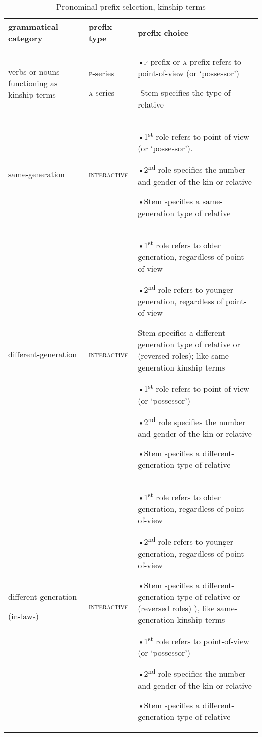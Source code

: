 \begin{table}
\caption{Pronominal prefix selection, kinship terms}
\label{tab:1:pronselkinship}
\tiny{
\begin{tabularx}{\textwidth}{XXX}

\lsptoprule
grammatical category & prefix type & prefix choice\\
\midrule
verbs or nouns functioning as kinship terms & \textsc{p}{}-series

\textsc{a}{}-series & •\textsc{p}-prefix or \textsc{a}{}-prefix refers to point-of-view (or ‘possessor’)

-Stem specifies the type of relative\\
same-generation & \textsc{interactive} & •1\textsuperscript{st} role refers to point-of-view (or ‘possessor’).


•2\textsuperscript{nd} role specifies the number and gender of the kin or relative

•Stem specifies a same-generation type of relative\\
different-generation & \textsc{interactive} & •1\textsuperscript{st} role refers to older generation, regardless of point-of-view

•2\textsuperscript{nd} role refers to younger generation, regardless of point-of-view

Stem specifies a different-generation type of relative or (reversed roles); like same-generation kinship terms

•1\textsuperscript{st} role refers to point-of-view (or ‘possessor’)

•2\textsuperscript{nd} role specifies the number and gender of the kin or relative

•Stem specifies a different-generation type of relative\\
different-generation 

(in-laws) & \textsc{interactive} & •1\textsuperscript{st} role refers to older generation, regardless of point-of-view

•2\textsuperscript{nd} role refers to younger generation, regardless of point-of-view

•Stem specifies a different-generation type of relative or (reversed roles) ), like same-generation kinship terms

•1\textsuperscript{st} role refers to point-of-view (or ‘possessor’)

•2\textsuperscript{nd} role specifies the number and gender of the kin or relative

•Stem specifies a different-generation type of relative


\end{tabularx}}
\end{table}
